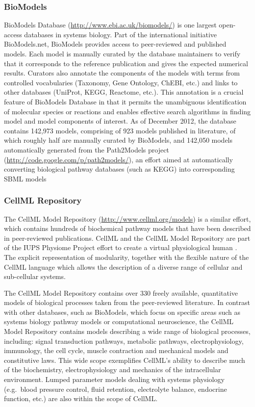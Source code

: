\subsubsection{BioModels}

BioModels Database (\url{http://www.ebi.ac.uk/biomodels/})
\autocite{le2006biomodels} is one largest open- access databases in
systems biology. Part of the international initiative BioModels.net,
BioModels provides access to peer-reviewed and published models. Each
model is manually curated by the database maintainers to verify that it
corresponds to the reference publication and gives the expected
numerical results. Curators also annotate the components of the models
with terms from controlled vocabularies (Taxonomy, Gene Ontology, ChEBI,
etc.) and links to other databases (UniProt, KEGG, Reactome, etc.). This
annotation is a crucial feature of BioModels Database in that it permits
the unambiguous identification of molecular species or reactions and
enables effective search algorithms in finding model and model
components of interest. As of December 2012, the database contains
142,973 models, comprising of 923 models published in literature, of
which roughly half are manually curated by BioModels, and 142,050 models
automatically generated from the Path2Models project
(\url{http://code.google.com/p/path2models/}), an effort aimed at
automatically converting biological pathway databases (such as KEGG)
into corresponding SBML models

\subsubsection{CellML Repository}

The CellML Model Repository (\url{http://www.cellml.org/models})
\autocite{lloyd2008cellml} \autocite{beard2009cellml} is a similar
effort, which contains hundreds of biochemical pathway models that have
been described in peer-reviewed publications. CellML and the CellML
Model Repository are part of the IUPS Physiome Project effort to create
a virtual physiological human \autocite{hunter2005integration}. The
explicit representation of modularity, together with the flexible nature
of the CellML language which allows the description of a diverse range
of cellular and sub-cellular systems.

The CellML Model Repository contains over 330 freely available,
quantitative models of biological processes taken from the peer-reviewed
literature. In contrast with other databases, such as BioModels, which
focus on specific areas such as systems biology pathway models or
computational neuroscience, the CellML Model Repository contains models
describing a wide range of biological processes, including: signal
transduction pathways, metabolic pathways, electrophysiology,
immunology, the cell cycle, muscle contraction and mechanical models and
constitutive laws. This wide scope exemplifies CellML's ability to
describe much of the biochemistry, electrophysiology and mechanics of
the intracellular environment. Lumped parameter models dealing with
systems physiology (e.g.~blood pressure control, fluid retention,
electrolyte balance, endocrine function, etc.) are also within the scope
of CellML.

